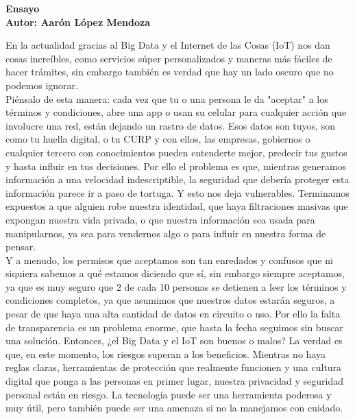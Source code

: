 \documentclass[12pt]{report}
\begin{document}
\begin{enumerate}[label=\textbf{\arabic*.}, leftmargin=*]
\begin{enumerate}[label=\textbf{\alph*.}, leftmargin=*, itemsep=1.0em]
\newpage
\textbf{Ensayo\\
        Autor: Aar\'on L\'opez Mendoza}


En la actualidad gracias al Big Data y el Internet de las Cosas (IoT) nos dan cosas increíbles, como servicios súper personalizados y maneras más fáciles de hacer trámites, sin embargo también es verdad que hay un lado oscuro que no podemos ignorar.\\
Piénsalo de esta manera: cada vez que tu o una persona le da "aceptar" a los términos y condiciones, abre una app o usan su celular para cualquier acción que involucre una red, están dejando un rastro de datos. Esos datos son tuyos, son como tu huella digital, o tu CURP y con ellos, las empresas, gobiernos o cualquier tercero con conocimientos pueden entenderte mejor, predecir tus gustos y hasta influir en tus decisiones.
Por ello el problema es que, mientras generamos información a una velocidad indescriptible, la seguridad que debería proteger esta información parece ir a paso de tortuga. Y esto nos deja vulnerables. Terminamos expuestos a que alguien robe nuestra identidad, que haya filtraciones masivas que expongan nuestra vida privada, o que nuestra información sea usada para manipularnos, ya sea para vendernos algo o para influir en nuestra forma de pensar.\\

Y a menudo, los permisos que aceptamos son tan enredados y confusos que ni siquiera sabemos a qué estamos diciendo que sí, sin embargo siempre aceptamos, ya que es muy seguro que 2 de cada 10 personas se detienen a leer los términos y condiciones completos, ya que asumimos que nuestros datos estarán seguros, a pesar de que haya una alta cantidad de datos en circuito o uso. Por ello la falta de transparencia es un problema enorme, que hasta la fecha seguimos sin buscar una solución.
Entonces, ¿el Big Data y el IoT son buenos o malos? La verdad es que, en este momento, los riesgos superan a los beneficios. Mientras no haya reglas claras, herramientas de protección que realmente funcionen y una cultura digital que ponga a las personas en primer lugar, nuestra privacidad y seguridad personal están en riesgo. La tecnología puede ser una herramienta poderosa y muy útil, pero también puede ser una amenaza si no la manejamos con cuidado.\\


\end{enumerate}
\end{enumerate}
\end{document}
